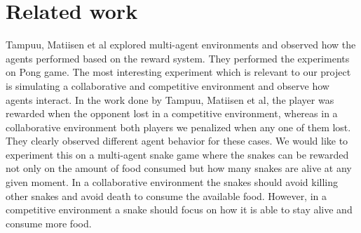 \documentclass{article}
\begin{document}
\section{Related work}
Tampuu, Matiisen et al\cite{sd3} explored multi-agent environments and observed how the agents performed based on the reward system. They performed the experiments on Pong game. The most interesting experiment which is relevant to our project is simulating a collaborative and competitive environment and observe how agents interact. In the work done by Tampuu, Matiisen et al\cite{sd3}, the player was rewarded when the opponent lost in a competitive environment, whereas in a collaborative environment both players we penalized when any one of them lost. They clearly observed different agent behavior for these cases.
\break
\break
We would like to experiment this on a multi-agent snake game where the snakes can be rewarded not only on the amount of food consumed but how many snakes are alive at any given moment. In a collaborative environment the snakes should avoid killing other snakes and avoid death to consume the available food. However, in a competitive environment a snake should focus on how it is able to stay alive and consume more food.
\end{document}

